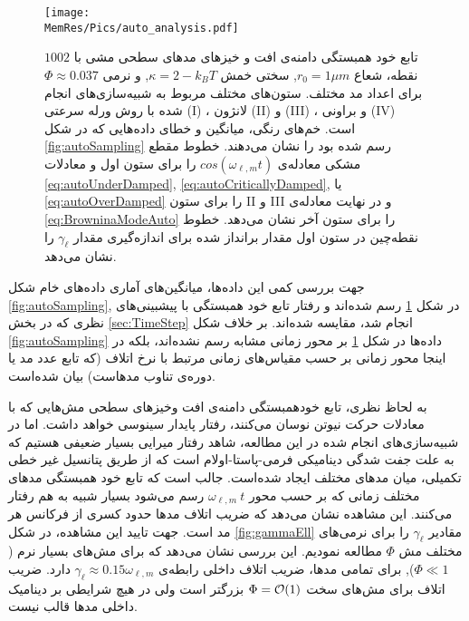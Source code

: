 \begin{figure}[htbp]
\begin{center}
\texttt{[image: \\MemRes/Pics/auto\_analysis.pdf]}
\caption{
تابع خود همبستگی دامنه‌ی افت و خیز‌های مد‌های سطحی مشی با 
 $1002$
نقطه، شعاع
 $r_0=1\mu m$,
 سختی خمش
$\kappa=2-k_BT$,
 و نرمی
 $\Phi\approx0.037$
برای اعداد مد مختلف. ستون‌های مختلف مربوط به شبیه‌سازی‌های انجام شده با روش ورله سرعتی
(I)
، لانژون
(II)
و
(III)
، و براونی 
(IV)
است. خم‌های رنگی، میانگین و خطای داده‌هایی که در شکل
\ref{fig:autoSampling}
رسم شده بود را نشان می‌دهند. خطوط مقطع مشکی معادله‌ی
$cos(\omega_{\ell,m}t)$
را برای ستون اول و معادلات
\ref{eq:autoUnderDamped}, \ref{eq:autoCriticallyDamped},
 یا 
\ref{eq:autoOverDamped}
را برای ستون 
II
و
III
 و در نهایت معادله‌ی 
 \ref {eq:BrowninaModeAuto}
 را برای ستون آخر نشان می‌دهد. خطوط نقطه‌چین در ستون اول مقدار برانداز شده برای اندازه‌گیری مقدار 
  $\gamma_\ell$
 را نشان می‌دهد.
}
\label{fig:autoAnalysis}
\end{center}
\end{figure}

جهت بررسی کمی‌ این داده‌ها، میانگین‌های آماری داده‌های خام شکل
\ref{fig:autoSampling},
 در شکل 
\ref{fig:autoAnalysis}
رسم شده‌اند و رفتار تابع خود همبستگی  با پیشبینی‌های نظری که در بخش 
\ref{sec:TimeStep}
انجام شد، مقایسه شده‌اند. بر خلاف شکل
\ref{fig:autoSampling}
داده‌ها در شکل
\ref{fig:autoAnalysis}
بر محور زمانی مشابه رسم نشده‌اند، بلکه در اینجا محور زمانی بر حسب مقیاس‌های زمانی مرتبط با نرخ اتلاف (که تابع  عدد مد یا دوره‌ی تناوب مدهاست) بیان شده‌است.

به لحاظ نظری، تابع خودهمبستگی دامنه‌ی افت وخیز‌های سطحی  مش‌هایی که با معادلات حرکت نیوتن نوسان می‌کنند، رفتار پایدار سینوسی خواهد داشت. اما در شبیه‌سازی‌های انجام شده در این مطالعه، شاهد رفتار میرایی بسیار ضعیفی هستیم که به علت جفت شدگی دینامیکی فرمی-پاستا-اولام
\cite{FPU}
است که از طریق پتانسیل غیر خطی تکمیلی، میان مد‌های مختلف ایجاد شده‌است. جالب است که تابع خود همبستگی مد‌های مختلف زمانی که بر حسب محور 
 $\omega_{\ell,m}~t$
رسم می‌شود بسیار شبیه به هم رفتار می‌کنند. این مشاهده نشان می‌دهد که ضریب اتلاف مد‌ها حدود کسری از فرکانس هر مد‌ است. جهت تایید این مشاهده، در شکل
\ref{fig:gammaEll}
مقادیر
 $\gamma_{\ell}$
را برای نرمی‌های مختلف مش
$\Phi$
مطالعه نمو‌دیم. این بررسی نشان می‌دهد که برای مش‌های بسیار نرم
($\Phi\ll1$),
برای تمامی‌ مد‌ها، ضریب اتلاف داخلی رابطه‌ی
 $\gamma_\ell\approx0.15\omega_{\ell,m}$
دارد. ضریب اتلاف برای مش‌های سخت
$\Phi = {\cal O}(1)$
 بزرگتر است ولی در هیچ شرایطی بر دینامیک داخلی مد‌ها قالب نیست.




